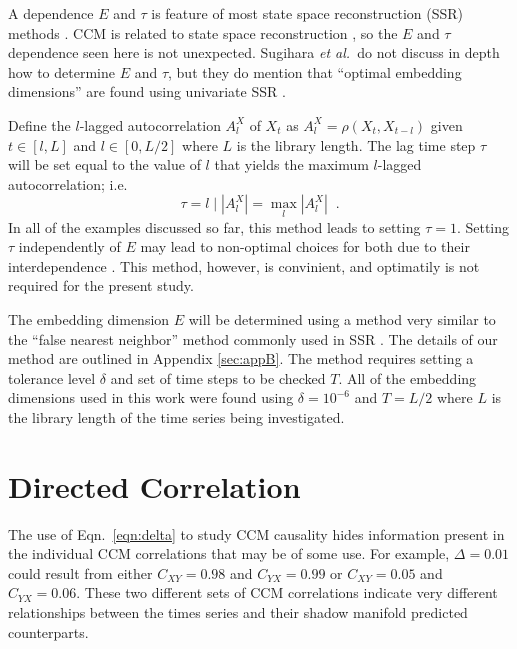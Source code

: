 \documentclass[a4paper,11pt]{article}
\begin{document}
A dependence $E$ and $\tau$ is feature of most state space reconstruction (SSR) methods \cite{DOI 10.1007/s11460-005-0023-7,STATE SPACE RECONSTRUCTION FROM MULTIPLE TIME SERIES,State Space Reconstruction for Multivariate Time Series Prediction,10.1016/j.physd.2004.03.006(links in email)}.  CCM is related to state space reconstruction \cite{suppmat}, so the $E$ and $\tau$ dependence seen here is not unexpected.  Sugihara {\em et al.\ }do not discuss in depth how to determine $E$ and $\tau$, but they do mention that ``optimal embedding dimensions'' are found using univariate SSR \cite{suppref}.  

Define the $l$-lagged autocorrelation $A_l^X$ of $X_t$ as $A_l^X=\rho\left(X_t,X_{t-l}\right)$ given $t\in[l,L]$ and $l\in[0,L/2]$ where $L$ is the library length.  The lag time step $\tau$ will be set equal to the value of $l$ that yields the maximum $l$-lagged autocorrelation; i.e.\
\begin{equation}
\tau = l \;|\; \left|A_l^X\right| = \max_l \left|A_l^X\right|\;\;.
\end{equation}
In all of the examples discussed so far, this method leads to setting $\tau=1$.  Setting $\tau$ independently of $E$ may lead to non-optimal choices for both due to their interdependence \cite{10.1016/j.physd.2004.03.006}.  This method, however, is convinient, and optimatily is not required for the present study.

The embedding dimension $E$ will be determined using a method very similar to the ``false nearest neighbor'' method commonly used in SSR \cite{embedding_dimension.pdf}.  The details of our method are outlined in Appendix \ref{sec:appB}.  The method requires setting a tolerance level $\delta$ and set of time steps to be checked $T$.  All of the embedding dimensions used in this work were found using $\delta=10^{-6}$ and $T=L/2$ where $L$ is the library length of the time series being investigated.

\section{Directed Correlation}
The use of Eqn.\ \ref{eqn:delta} to study CCM causality hides information present in the individual CCM correlations that may be of some use.  For example, $\Delta = 0.01$ could result from either $C_{XY} = 0.98$ and $C_{YX} = 0.99$ or $C_{XY} = 0.05$ and $C_{YX} = 0.06$.  These two different sets of CCM correlations indicate very different relationships between the times series and their shadow manifold predicted counterparts.  
\end{document}
